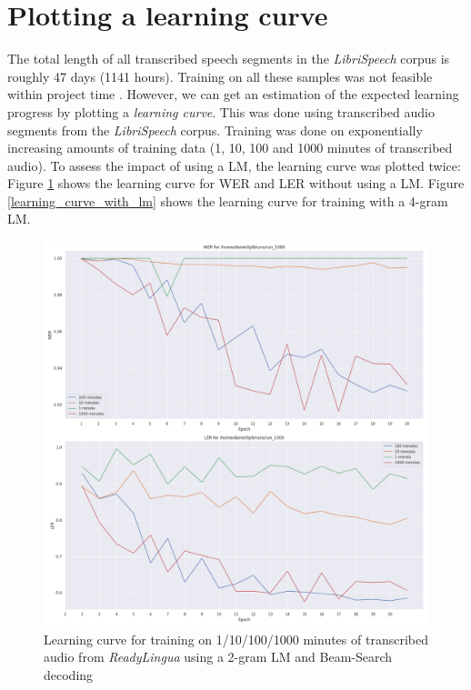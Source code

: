 \section{Plotting a learning curve}

The total length of all transcribed speech segments in the \textit{LibriSpeech} corpus is roughly 47 days (1141 hours). Training on all these samples was not feasible within project time . However, we can get an estimation of the expected learning progress by plotting a \textit{learning curve}. This was done using transcribed audio segments from the \textit{LibriSpeech} corpus. Training was done on exponentially increasing amounts of training data (1, 10, 100 and 1000 minutes of transcribed audio). To assess the impact of using a \ac{LM}, the learning curve was plotted twice: Figure \ref{learning_curve_without_lm} shows the learning curve for \ac{WER} and \ac{LER} without using a \ac{LM}. Figure \ref{learning_curve_with_lm} shows the learning curve for training with a 4-gram \ac{LM}.

\begin{figure}
	\includegraphics[width=\linewidth]{./img/learning_curve_lm_beamsearch.png}
	\caption{Learning curve for training on 1/10/100/1000 minutes of transcribed audio from \textit{ReadyLingua} using a 2-gram \ac{LM} and Beam-Search decoding}
	\label{learning_curve_without_lm}
\end{figure}

